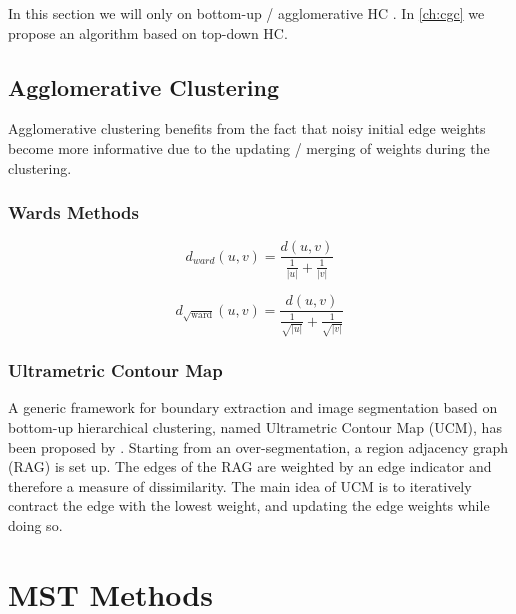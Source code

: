 In this section we will only on bottom-up / agglomerative HC . 
In \cref{ch:cgc}  we propose an algorithm  based on top-down HC.

\subsection{Agglomerative Clustering}\label{sec:hc_agglomerative_clustering}

Agglomerative clustering benefits from the fact that noisy initial edge weights
become more informative due to the updating / merging of weights during the clustering.

 \label{fig:hc_noise_reduction}


\subsubsection{Wards Methods}\label{sec:hc_wards_method}


\begin{equation} \label{eq:wards_method}
    d_{ward}(u,v) =  \frac{d(u,v)}{ \frac{1}{|u|} + \frac{1}{|v|} }
\end{equation}

\begin{equation} \label{eq:sqrt_wards_method}
    d_{\sqrt{\text{ward}}}(u,v) =  \frac{d(u,v)}{ \frac{1}{\sqrt{|u|}} + \frac{1}{\sqrt{|v|}} }
\end{equation}



\subsubsection{Ultrametric Contour Map}\label{sec:hc_ucm}

A generic framework for boundary extraction and image segmentation based
on bottom-up hierarchical clustering, named Ultrametric Contour Map (UCM), 
has been proposed by \citet{arbelaez_2006_cvpr} . 
Starting from an over-segmentation, a region adjacency graph (RAG) is set up.
The edges of the RAG are weighted by an edge indicator and therefore a measure  of dissimilarity.
The main idea of UCM is to iteratively contract the edge with the lowest weight, 
and updating the edge weights while doing so.

\section{MST Methods}\label{sec:rw_mst_methods}


